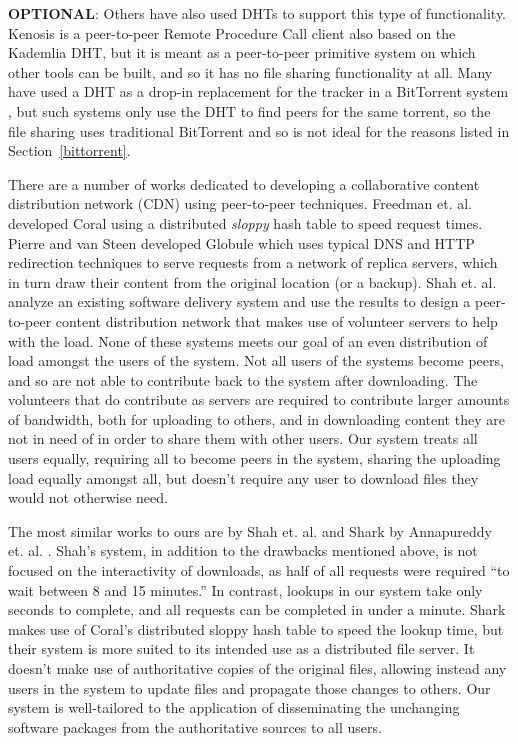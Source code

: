 \documentclass[conference]{IEEEtran}
\begin{document}
\textbf{OPTIONAL}: Others have also used DHTs to support this type of functionality.
Kenosis \cite{kenosis} is a peer-to-peer Remote Procedure Call
client also based on the Kademlia DHT, but it is meant as a peer-to-peer
primitive system on which other tools can be built, and so it has no
file sharing functionality at all. Many have used a DHT as a drop-in
replacement for the tracker in a BitTorrent system
\cite{bittorrent-dht, azureus-dht}, but such systems only use the
DHT to find peers for the same torrent, so the file sharing uses
traditional BitTorrent and so is not ideal for the reasons listed
in Section~\ref{bittorrent}.


There are a number of works dedicated to developing a collaborative
content distribution network (CDN) using peer-to-peer techniques.
Freedman et. al. developed Coral \cite{coral} using a distributed
\emph{sloppy} hash table to speed request times. Pierre and van
Steen developed Globule \cite{globule} which uses typical DNS and
HTTP redirection techniques to serve requests from a network of
replica servers, which in turn draw their content from the original
location (or a backup). Shah et. al. \cite{shah08} analyze an
existing software delivery system and use the results to design a
peer-to-peer content distribution network that makes use of
volunteer servers to help with the load. None of these systems meets
our goal of an even distribution of load amongst the users of the
system. Not all users of the systems become peers, and so are not
able to contribute back to the system after downloading. The
volunteers that do contribute as servers are required to contribute
larger amounts of bandwidth, both for uploading to others, and in
downloading content they are not in need of in order to share them
with other users. Our system treats all users equally, requiring all
to become peers in the system, sharing the uploading load equally
amongst all, but doesn't require any user to download files they
would not otherwise need.

The most similar works to ours are by Shah et. al. \cite{shah08} and
Shark by Annapureddy et. al. \cite{shark}.
Shah's system, in addition to the drawbacks mentioned above,
is not focused on the interactivity of downloads, as
half of all requests were required ``to wait between 8 and 15
minutes.'' In contrast, lookups in our system take only seconds to
complete, and all requests can be completed in under a minute.
Shark makes use of Coral's distributed sloppy hash table to speed
the lookup time, but their system is more suited to its intended use
as a distributed file server. It doesn't make use of authoritative
copies of the original files, allowing instead any users in the
system to update files and propagate those changes to others. Our
system is well-tailored to the application of disseminating the
unchanging software packages from the authoritative sources to all
users.
\end{document}
